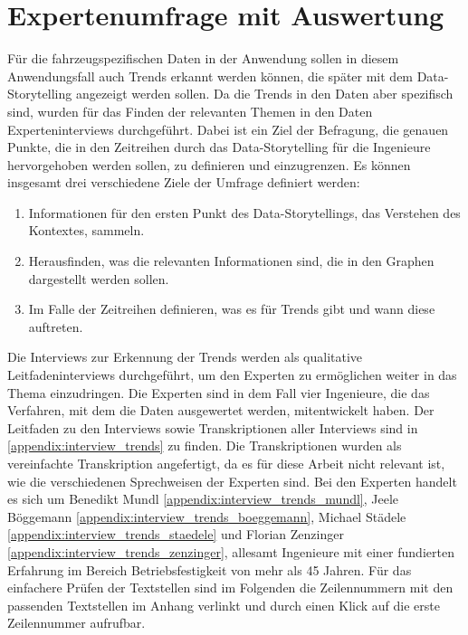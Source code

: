 \section{Expertenumfrage mit Auswertung}
Für die fahrzeugspezifischen Daten in der Anwendung sollen in diesem Anwendungsfall auch Trends erkannt werden können, die später mit dem Data-Storytelling angezeigt werden sollen. Da die Trends in den Daten aber spezifisch sind, wurden für das Finden der relevanten Themen in den Daten Experteninterviews durchgeführt. Dabei ist ein Ziel der Befragung, die genauen Punkte, die in den Zeitreihen durch das Data-Storytelling für die Ingenieure hervorgehoben werden sollen, zu definieren und einzugrenzen. Es können insgesamt drei verschiedene Ziele der Umfrage definiert werden:
\begin{enumerate}
    \item Informationen für den ersten Punkt des Data-Storytellings, das Verstehen des Kontextes, sammeln.
    \item Herausfinden, was die relevanten Informationen sind, die in den Graphen dargestellt werden sollen.
    \item Im Falle der Zeitreihen definieren, was es für Trends gibt und wann diese auftreten.
\end{enumerate}
Die Interviews zur Erkennung der Trends werden als qualitative Leitfadeninterviews \cite{Engineering.2018} durchgeführt, um den Experten zu ermöglichen weiter in das Thema einzudringen. Die Experten sind in dem Fall vier Ingenieure, die das Verfahren, mit dem die Daten ausgewertet werden, mitentwickelt haben. Der Leitfaden zu den Interviews sowie Transkriptionen aller Interviews sind in \ref{appendix:interview_trends} zu finden. Die Transkriptionen wurden als vereinfachte Transkription angefertigt, da es für diese Arbeit nicht relevant ist, wie die verschiedenen Sprechweisen der Experten sind. Bei den Experten handelt es sich um Benedikt Mundl \ref{appendix:interview_trends_mundl}, Jeele Böggemann \ref{appendix:interview_trends_boeggemann}, Michael Städele \ref{appendix:interview_trends_staedele} und Florian Zenzinger \ref{appendix:interview_trends_zenzinger}, allesamt Ingenieure mit einer fundierten Erfahrung im Bereich Betriebsfestigkeit von mehr als 45 Jahren. Für das einfachere Prüfen der Textstellen sind im Folgenden die Zeilennummern mit den passenden Textstellen im Anhang verlinkt und durch einen Klick auf die erste Zeilennummer aufrufbar.\\
